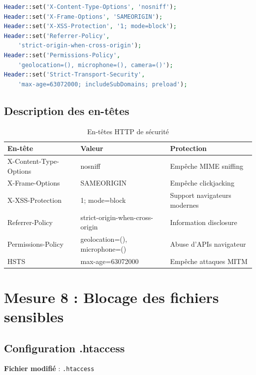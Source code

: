 \documentclass[11pt,a4paper,french]{report}
\begin{document}
\begin{lstlisting}[language=PHP]
Header::set('X-Content-Type-Options', 'nosniff');
Header::set('X-Frame-Options', 'SAMEORIGIN');
Header::set('X-XSS-Protection', '1; mode=block');
Header::set('Referrer-Policy', 
    'strict-origin-when-cross-origin');
Header::set('Permissions-Policy', 
    'geolocation=(), microphone=(), camera=()');
Header::set('Strict-Transport-Security', 
    'max-age=63072000; includeSubDomains; preload');
\end{lstlisting}

\subsection{Description des en-têtes}

\begin{table}[H]
\centering
\caption{En-têtes HTTP de sécurité}
\begin{tabular}{|l|p{2.5cm}|p{3.5cm}|}
\hline
\textbf{En-tête} & \textbf{Valeur} & \textbf{Protection} \\
\hline
X-Content-Type-Options & nosniff & Empêche MIME sniffing \\
\hline
X-Frame-Options & SAMEORIGIN & Empêche clickjacking \\
\hline
X-XSS-Protection & 1; mode=block & Support navigateurs modernes \\
\hline
Referrer-Policy & strict-origin-when-cross-origin & Information disclosure \\
\hline
Permissions-Policy & geolocation=(), microphone=() & Abuse d'APIs navigateur \\
\hline
HSTS & max-age=63072000 & Empêche attaques MITM \\
\hline
\end{tabular}
\end{table}

\newpage

\section{Mesure 8 : Blocage des fichiers sensibles}

\subsection{Configuration .htaccess}

\textbf{Fichier modifié} : \texttt{.htaccess}
\end{document}

